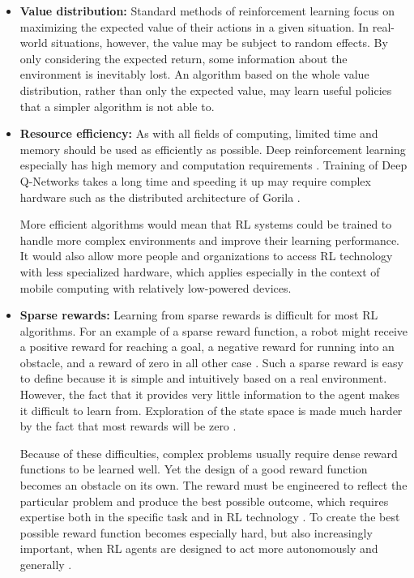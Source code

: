 \documentclass[runningheads]{llncs}
\begin{document}
\begin{itemize}

    \item \textbf{Value distribution:} Standard methods of reinforcement learning focus on maximizing the expected value of their actions in a given situation. In real-world situations, however, the value may be subject to random effects. By only considering the expected return, some information about the environment is inevitably lost. An algorithm based on the whole value distribution, rather than only the expected value, may learn useful policies that a simpler algorithm is not able to.

    \item \textbf{Resource efficiency:} As with all fields of computing, limited time and memory should be used as efficiently as possible. Deep reinforcement learning especially has high memory and computation requirements \cite{mnih2016asynchronous}. Training of Deep Q-Networks takes a long time and speeding it up may require complex hardware such as the distributed architecture of Gorila \cite{nair2015massively}.
    
    More efficient algorithms would mean that RL systems could be trained to handle more complex environments and improve their learning performance. It would also allow more people and organizations to access RL technology with less specialized hardware, which applies especially in the context of mobile computing with relatively low-powered devices. 
    
    \item \textbf{Sparse rewards:} Learning from sparse rewards is difficult for most RL algorithms. For an example of a sparse reward function, a robot might receive a positive reward for reaching a goal, a negative reward for running into an obstacle, and a reward of zero in all other case \cite{smart2002effective}. Such a sparse reward is easy to define because it is simple and intuitively based on a real environment. However, the fact that it provides very little information to the agent makes it difficult to learn from. Exploration of the state space is made much harder by the fact that most rewards will be zero \cite{smart2002effective}.
    
    Because of these difficulties, complex problems usually require dense reward functions to be learned well. Yet the design of a good reward function becomes an obstacle on its own. The reward must be engineered to reflect the particular problem and produce the best possible outcome, which requires expertise both in the specific task and in RL technology \cite{andrychowicz2017hindsight}. To create the best possible reward function becomes especially hard, but also increasingly important, when RL agents are designed to act more autonomously and generally \cite{dewey2014reinforcement}.
    

\end{itemize}
\end{document}
